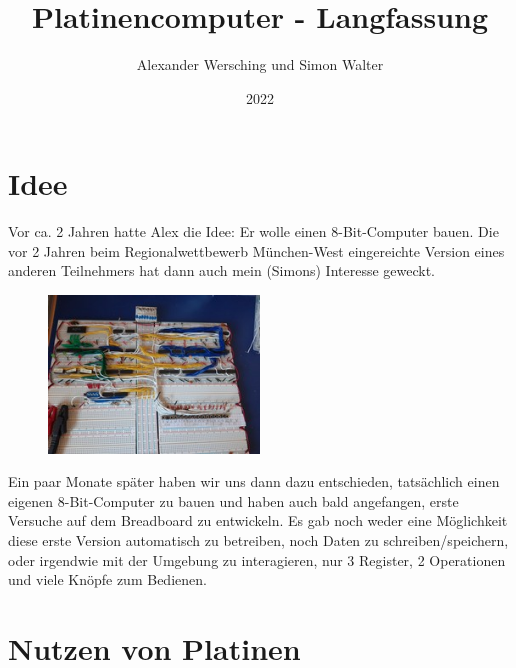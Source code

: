 \documentclass{scrartcl}
\begin{document}
    \title{Platinencomputer - Langfassung}
    \author{Alexander Wersching und Simon Walter}
    \date{2022}
    \maketitle

    \tableofcontents

    \newpage
    \section{Idee}
    \vspace{-15pt}
    Vor ca. 2 Jahren hatte Alex die Idee: Er wolle einen 8-Bit-Computer bauen.
    Die vor 2 Jahren beim Regionalwettbewerb München-West eingereichte Version eines anderen Teilnehmers hat dann auch mein (Simons) Interesse geweckt.
    \newline
    \vspace{-15pt}
        \begin{figure}
        \vspace{-25pt}
        \begin{center}
            \includegraphics[width=0.5\textwidth]{Computer_V01_Overview_01}
        \end{center}
        \vspace{-20pt}
        \end{figure}
    Ein paar Monate später haben wir uns dann dazu entschieden, tatsächlich einen eigenen 8-Bit-Computer zu bauen und haben auch bald angefangen, erste Versuche auf dem Breadboard zu entwickeln.
    Es gab noch weder eine Möglichkeit diese erste Version automatisch zu betreiben, noch Daten zu schreiben/speichern, oder irgendwie mit der Umgebung zu interagieren, nur 3 Register, 2 Operationen und viele Knöpfe zum Bedienen.


    \section{Nutzen von Platinen}
    \vspace{-15pt}
\end{document}

